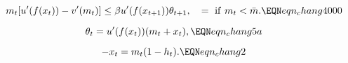 
$$ m_t [u'(f(x_t))   - v'(m_t) ] \leq \beta u'(f(x_{t+1})) \theta_{t+1}, \quad = \ {\rm if} \ m_t < \bar m. \EQN eqn_chang4000 $$

$$ \theta_t = u'(f(x_t)) (m_t + x_t), \EQN eqn_chang5a $$


$$ - x_t = m_t (1-h_t).  \EQN eqn_chang2 $$